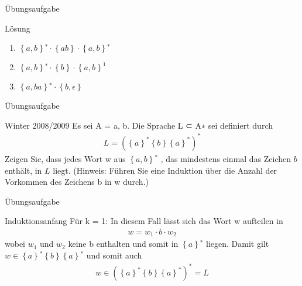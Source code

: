 \documentclass[18pt]{beamer}
\begin{document}
\begin{frame}{Übungsaufgabe}
    \begin{block}{Lösung}
        \begin{enumerate}
            \item $\left\{a, b\right\}^∗ \cdot \left\{ab\right\} \cdot \left\{a, b\right\}^∗$
            \item $\left\{a, b\right\}^∗ \cdot \left\{b\right\} \cdot \left\{a, b\right\}^1$
            \item $\left\{a, ba\right\}^∗ \cdot \left\{b, \epsilon\right\}$
        \end{enumerate}
    \end{block}
\end{frame}
\begin{frame}{Übungsaufgabe}
    \begin{block}{Winter 2008/2009}
        Es sei A = {a, b}. Die Sprache L ⊂ A∗ sei definiert durch
        \begin{align*}
            L = \left( \left\{ a\right\}^* \left\{ b\right\} \left\{ a\right\}^*\right)^*
        \end{align*}
        Zeigen Sie, dass jedes Wort w aus $\left\{a, b\right\}^∗$ , das mindestens einmal das Zeichen $b$ enthält, in $L$ liegt. (Hinweis: Führen Sie eine Induktion über die Anzahl der Vorkommen des Zeichens b in w durch.)
    \end{block}
\end{frame}
\begin{frame}{Übungsaufgabe}
    \begin{block}{Induktionsanfang}
        Für k = 1: In diesem Fall lässt sich das Wort w aufteilen in
        \begin{align*}
            w = w_1 \cdot b \cdot w_2
        \end{align*}
        wobei $w_1$ und $w_2$ keine b enthalten und somit in $\left\{ a\right\}^∗$ liegen. Damit gilt $w \in \left\{ a\right\}^∗ \left\{ b\right\}\left\{ a\right\}^∗$ und somit auch
        \begin{align*}
            w \in \left(\left\{ a\right\}^* \left\{ b\right\}\left\{ a\right\}^* \right)^* = L
        \end{align*}        
    \end{block}
\end{frame}
\end{document}
